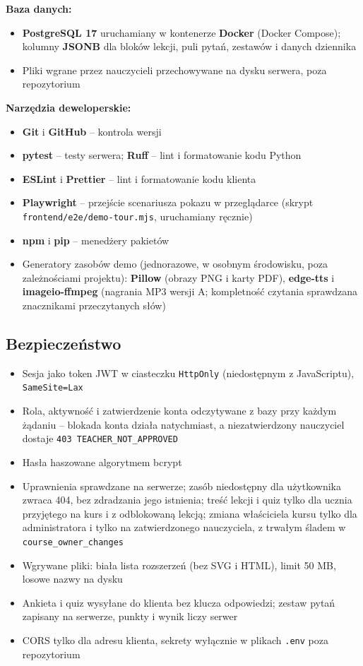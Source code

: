 \textbf{Baza danych:}
\begin{itemize}[leftmargin=*]
    \item \textbf{PostgreSQL 17} uruchamiany w kontenerze \textbf{Docker} (Docker Compose); kolumny \textbf{JSONB} dla bloków lekcji, puli pytań, zestawów i danych dziennika
    \item Pliki wgrane przez nauczycieli przechowywane na dysku serwera, poza repozytorium
\end{itemize}

\textbf{Narzędzia deweloperskie:}
\begin{itemize}[leftmargin=*]
    \item \textbf{Git} i \textbf{GitHub} -- kontrola wersji
    \item \textbf{pytest} -- testy serwera; \textbf{Ruff} -- lint i formatowanie kodu Python
    \item \textbf{ESLint} i \textbf{Prettier} -- lint i formatowanie kodu klienta
    \item \textbf{Playwright} -- przejście scenariusza pokazu w przeglądarce (skrypt \nolinkurl{frontend/e2e/demo-tour.mjs}, uruchamiany ręcznie)
    \item \textbf{npm} i \textbf{pip} -- menedżery pakietów
    \item Generatory zasobów demo (jednorazowe, w osobnym środowisku, poza zależnościami projektu): \textbf{Pillow} (obrazy PNG i karty PDF), \textbf{edge-tts} i \textbf{imageio-ffmpeg} (nagrania MP3 wersji A; kompletność czytania sprawdzana znacznikami przeczytanych słów)
\end{itemize}

\subsection{Bezpieczeństwo}

\begin{itemize}[leftmargin=*]
    \item Sesja jako token JWT w ciasteczku \texttt{HttpOnly} (niedostępnym z JavaScriptu), \texttt{SameSite=Lax}
    \item Rola, aktywność i zatwierdzenie konta odczytywane z bazy przy każdym żądaniu -- blokada konta działa natychmiast, a niezatwierdzony nauczyciel dostaje \texttt{403 TEACHER\_NOT\_APPROVED}
    \item Hasła haszowane algorytmem bcrypt
    \item Uprawnienia sprawdzane na serwerze; zasób niedostępny dla użytkownika zwraca 404, bez zdradzania jego istnienia; treść lekcji i quiz tylko dla ucznia przyjętego na kurs i z odblokowaną lekcją; zmiana właściciela kursu tylko dla administratora i tylko na zatwierdzonego nauczyciela, z trwałym śladem w \texttt{course\_owner\_changes}
    \item Wgrywane pliki: biała lista rozszerzeń (bez SVG i HTML), limit 50 MB, losowe nazwy na dysku
    \item Ankieta i quiz wysyłane do klienta bez klucza odpowiedzi; zestaw pytań zapisany na serwerze, punkty i wynik liczy serwer
    \item CORS tylko dla adresu klienta, sekrety wyłącznie w plikach \texttt{.env} poza repozytorium
\end{itemize}

